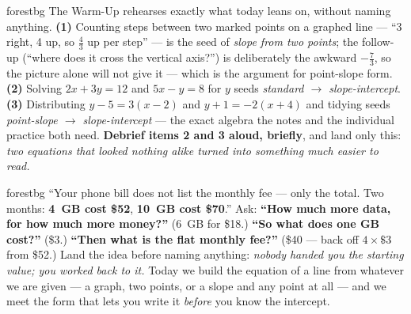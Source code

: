 \documentclass[10pt]{article}
\begin{document}
\begin{fixedskillbox}{forestbg}
    The Warm-Up rehearses exactly what today leans on, without naming anything. \textbf{(1)} Counting
    steps between two marked points on a graphed line --- ``3 right, 4 up, so $\tfrac43$ up per
    step'' --- is the seed of \emph{slope from two points}; the follow-up (``where does it cross the
    vertical axis?'') is deliberately the awkward $-\tfrac73$, so the picture alone will not give
    it --- which is the argument for point-slope form. \textbf{(2)} Solving $2x+3y=12$ and $5x-y=8$
    for $y$ seeds \emph{standard $\to$ slope-intercept}. \textbf{(3)} Distributing $y-5=3(x-2)$ and
    $y+1=-2(x+4)$ and tidying seeds \emph{point-slope $\to$ slope-intercept} --- the exact algebra
    the notes and the individual practice both need. \textbf{Debrief items 2 and 3 aloud, briefly}, and land
    only this: \emph{two equations that looked nothing alike turned into something much easier to
    read.}
\end{fixedskillbox}

\begin{skillbox}[Hook]{forestbg}
    ``Your phone bill does not list the monthly fee --- only the total. Two months: \textbf{4~GB cost
    \$52}, \textbf{10~GB cost \$70}.'' Ask: \textbf{``How much more data, for how much more
    money?''} ($6$~GB for \$18.) \textbf{``So what does one GB cost?''} (\$3.) \textbf{``Then what is
    the flat monthly fee?''} (\$40 --- back off $4\times\$3$ from \$52.) Land the idea before naming
    anything: \emph{nobody handed you the starting value; you worked back to it.} Today we build the
    equation of a line from whatever we are given --- a graph, two points, or a slope and any point
    at all --- and we meet the form that lets you write it \emph{before} you know the intercept.
\end{skillbox}
\end{document}
